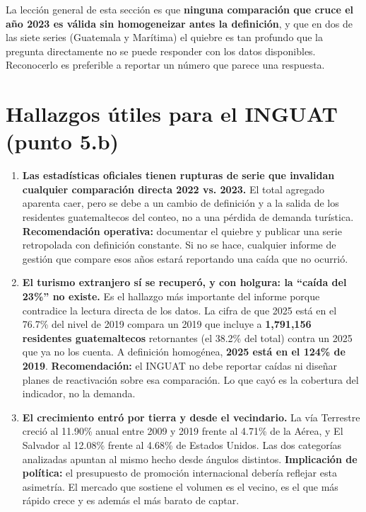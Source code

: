 \documentclass[12pt,letterpaper]{article}
\newcommand{\seccion}[1]{\section{#1}}
\begin{document}
La lección general de esta sección es que \textbf{ninguna comparación que cruce el año 2023 es
válida sin homogeneizar antes la definición}, y que en dos de las siete series (Guatemala y
Marítima) el quiebre es tan profundo que la pregunta directamente no se puede responder con los
datos disponibles. Reconocerlo es preferible a reportar un número que parece una respuesta.

\seccion{Hallazgos útiles para el INGUAT (punto 5.b)}

\begin{enumerate}[leftmargin=1.6em,itemsep=6pt]

\item \textbf{Las estadísticas oficiales tienen rupturas de serie que invalidan cualquier
comparación directa 2022 vs. 2023.} El total agregado aparenta caer, pero se debe a un cambio de
definición y a la salida de los residentes guatemaltecos del conteo, no a una pérdida de demanda
turística. \textbf{Recomendación operativa:} documentar el quiebre y publicar una serie
retropolada con definición constante. Si no se hace, cualquier informe de gestión que compare
esos años estará reportando una caída que no ocurrió.

\item \textbf{El turismo extranjero sí se recuperó, y con holgura: la ``caída del 23\%'' no
existe.} Es el hallazgo más importante del informe porque contradice la lectura directa de los
datos. La cifra de que 2025 está en el 76.7\% del nivel de 2019 compara un 2019 que incluye a
\textbf{1{,}791{,}156 residentes guatemaltecos} retornantes (el 38.2\% del total) contra un 2025
que ya no los cuenta. A definición homogénea, \textbf{2025 está en el 124\% de 2019}.
\textbf{Recomendación:} el INGUAT no debe reportar caídas ni diseñar planes de reactivación
sobre esa comparación. Lo que cayó es la cobertura del indicador, no la demanda.

\item \textbf{El crecimiento entró por tierra y desde el vecindario.} La vía Terrestre creció al
11.90\% anual entre 2009 y 2019 frente al 4.71\% de la Aérea, y El Salvador al 12.08\% frente al
4.68\% de Estados Unidos. Las dos categorías analizadas apuntan al mismo hecho desde ángulos
distintos. \textbf{Implicación de política:} el presupuesto de promoción internacional debería
reflejar esta asimetría. El mercado que sostiene el volumen es el vecino, es el que más rápido
crece y es además el más barato de captar.


\end{enumerate}
\end{document}
